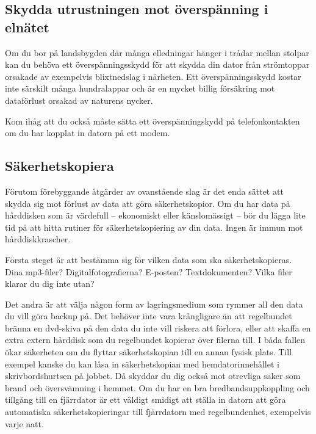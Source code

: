 \documentclass[a4paper,final]{memoir} %
\begin{document}
\subsection{Skydda utrustningen mot överspänning i elnätet}

Om du bor på landsbygden där många elledningar hänger i trådar mellan stolpar kan du behöva ett överspänningsskydd för att skydda din dator från strömtoppar orsakade av exempelvis blixtnedslag i närheten. Ett överspänningsskydd kostar inte särskilt många hundralappar och är en mycket billig försäkring mot dataförlust orsakad av naturens nycker.

Kom ihåg att du också måste sätta ett överspänningskydd på telefonkontakten om du har kopplat in datorn på ett modem.


\subsection{Säkerhetskopiera}

Förutom förebyggande åtgärder av ovanstående slag är det enda sättet att skydda sig mot förlust av data att göra säkerhetskopior. Om du har data på hårddisken som är värdefull -- ekonomiskt eller känslomässigt -- bör du lägga lite tid på att hitta rutiner för säkerhetskopiering av din data. Ingen är immun mot hårddiskkrascher. %

Första steget är att bestämma sig för vilken data som ska säkerhetskopieras. Dina mp3-filer? Digitalfotografierna? E-posten? Textdokumenten? Vilka filer klarar du dig inte utan?

Det andra är att välja någon form av lagringsmedium som rymmer all den data du vill göra backup på. Det behöver inte vara krångligare än att regelbundet bränna en dvd-skiva på den data du inte vill riskera att förlora, eller att skaffa en extra extern hårddisk som du regelbundet kopierar över filerna till. I båda fallen ökar säkerheten om du flyttar säkerhetskopian till en annan fysisk plats. Till exempel kanske du kan låsa in säkerhetskopian med hemdatorinnehållet i skrivbordshurtsen på jobbet. Då skyddar du dig också mot otrevliga saker som brand och översvämning i hemmet. Om du har en bra bredbandsuppkoppling och tillgång till en fjärrdator är ett väldigt smidigt att ställa in datorn att göra automatiska säkerhetskopieringar till fjärrdatorn med regelbundenhet, exempelvis varje natt.
\end{document}
